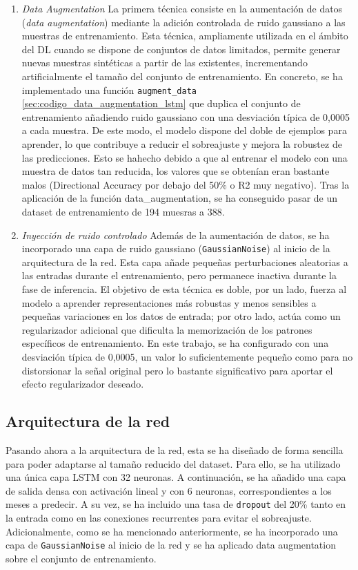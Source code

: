 \begin{enumerate}
    \item \emph{Data Augmentation}
    La primera técnica consiste en la aumentación de datos (\emph{data augmentation}) \cite{data_augmentation} mediante la adición controlada de ruido gaussiano a las muestras de entrenamiento. Esta técnica, ampliamente utilizada en el ámbito del DL cuando se dispone de conjuntos de datos limitados, permite generar nuevas muestras sintéticas a partir de las existentes, incrementando artificialmente el tamaño del conjunto de entrenamiento. En concreto, se ha implementado una función \texttt{augment\_data} \ref{sec:codigo_data_augmentation_lstm} que duplica el conjunto de entrenamiento añadiendo ruido gaussiano con una desviación típica de 0,0005 a cada muestra. De este modo, el modelo dispone del doble de ejemplos para aprender, lo que contribuye a reducir el sobreajuste y mejora la robustez de las predicciones. Esto se hahecho debido a que al entrenar el modelo con una muestra de datos tan reducida, los valores que se obtenían eran bastante malos (Directional Accuracy por debajo del 50\% o R2 muy negativo). Tras la aplicación de la función data\_augmentation, se ha conseguido pasar de un dataset de entrenamiento de 194 muesras a 388.
    
    \item \emph{Inyección de ruido controlado}
    Además de la aumentación de datos, se ha incorporado una capa de ruido gaussiano (\texttt{GaussianNoise}) \cite{gausian_noise} al inicio de la arquitectura de la red. Esta capa añade pequeñas perturbaciones aleatorias a las entradas durante el entrenamiento, pero permanece inactiva durante la fase de inferencia. El objetivo de esta técnica es doble, por un lado, fuerza al modelo a aprender representaciones más robustas y menos sensibles a pequeñas variaciones en los datos de entrada; por otro lado, actúa como un regularizador adicional que dificulta la memorización de los patrones específicos de entrenamiento. En este trabajo, se ha configurado con una desviación típica de 0,0005, un valor lo suficientemente pequeño como para no distorsionar la señal original pero lo bastante significativo para aportar el efecto regularizador deseado.
\end{enumerate}

\subsection{Arquitectura de la red}
Pasando ahora a la arquitectura de la red, esta se ha diseñado de forma sencilla para poder adaptarse al tamaño reducido del dataset. Para ello, se ha utilizado una única capa LSTM con 32 neuronas. A continuación, se ha añadido una capa de salida densa con activación lineal y con 6 neuronas, correspondientes a los meses a predecir. A su vez, se ha incluido una tasa de \texttt{dropout} \cite{dropout} del 20\% tanto en la entrada como en las conexiones recurrentes para evitar el sobreajuste. Adicionalmente, como se ha mencionado anteriormente, se ha incorporado una capa de \texttt{GaussianNoise} al inicio de la red y se ha aplicado data augmentation sobre el conjunto de entrenamiento.

